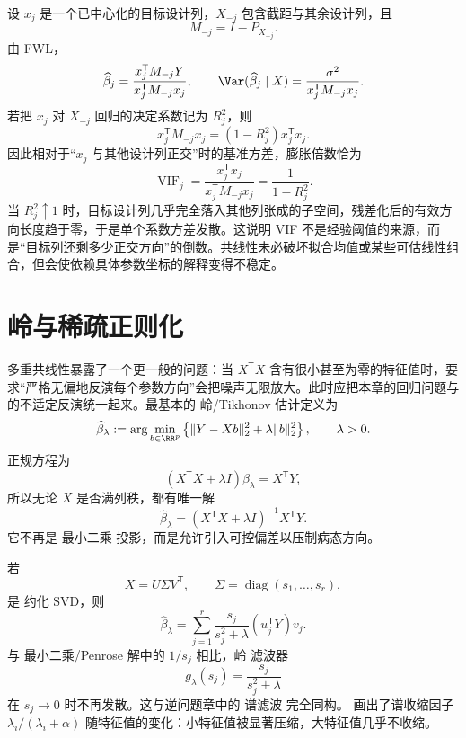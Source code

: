 \begin{proposition}
设 $x_j$ 是一个已中心化的目标设计列，$X_{-j}$ 包含截距与其余设计列，且
\[
 M_{-j}=I-P_{X_{-j}}.
\]
由 FWL，
\[
 \widehat\beta_j
 =\frac{x_j^{\mathsf T}M_{-j}Y}
 {x_j^{\mathsf T}M_{-j}x_j},
 \qquad
 \Var(\widehat\beta_j\mid X)
 =\frac{\sigma^2}{x_j^{\mathsf T}M_{-j}x_j}.
\]
若把 $x_j$ 对 $X_{-j}$ 回归的决定系数记为 $R_j^2$，则
\[
 x_j^{\mathsf T}M_{-j}x_j
 =(1-R_j^2)x_j^{\mathsf T}x_j.
\]
因此相对于“$x_j$ 与其他设计列正交”时的基准方差，膨胀倍数恰为
\begin{equation*}\operatorname{VIF}_j
 =\frac{x_j^{\mathsf T}x_j}
 {x_j^{\mathsf T}M_{-j}x_j}
 =\frac1{1-R_j^2}.
\end{equation*}
当 $R_j^2\uparrow1$ 时，目标设计列几乎完全落入其他列张成的子空间，残差化后的有效方向长度趋于零，于是单个系数方差发散。这说明 VIF 不是经验阈值的来源，而是“目标列还剩多少正交方向”的倒数。共线性未必破坏拟合均值或某些可估线性组合，但会使依赖具体参数坐标的解释变得不稳定。
\end{proposition}

\section{岭与稀疏正则化}

\begin{definition}
多重共线性暴露了一个更一般的问题：当 $X^{\mathsf T}X$ 含有很小甚至为零的特征值时，要求“严格无偏地反演每个参数方向”会把噪声无限放大。此时应把本章的回归问题与  的不适定反演统一起来。最基本的 岭/Tikhonov 估计定义为
\begin{equation*}\widehat\beta_\lambda
:=\arg\min_{b\in\RR^p}
\left\{
\|Y-Xb\|_2^2+\lambda\|b\|_2^2
\right\},
\qquad \lambda>0.\end{equation*}
正规方程为
\begin{equation*}(X^{\mathsf T}X+\lambda I)\widehat\beta_\lambda
=X^{\mathsf T}Y,\end{equation*}
所以无论 $X$ 是否满列秩，都有唯一解
\begin{equation}
\widehat\beta_\lambda
=(X^{\mathsf T}X+\lambda I)^{-1}X^{\mathsf T}Y.
\label{eq:ridge-solution}
\end{equation}
它不再是 最小二乘 投影，而是允许引入可控偏差以压制病态方向。
\end{definition}

\begin{proposition}[岭估计的谱滤波与均值收缩]
若
\[
X=U\Sigma V^{\mathsf T},
\qquad
\Sigma=\operatorname{diag}(s_1,\ldots,s_r),
\]
是 约化 SVD，则
\begin{equation*}\widehat\beta_\lambda
=\sum_{j=1}^r
\frac{s_j}{s_j^2+\lambda}
(u_j^{\mathsf T}Y)v_j.\end{equation*}
与 最小二乘/Penrose 解中的 $1/s_j$ 相比，岭 滤波器
\[
g_\lambda(s_j)=\frac{s_j}{s_j^2+\lambda}
\]
在 $s_j\to0$ 时不再发散。这与逆问题章中的 谱滤波 完全同构。 画出了谱收缩因子 $\lambda_i/(\lambda_i+\alpha)$ 随特征值的变化：小特征值被显著压缩，大特征值几乎不收缩。
\end{proposition}

